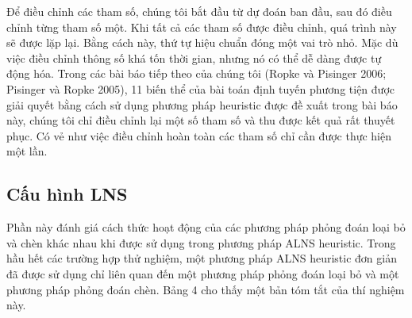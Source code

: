 Để điều chỉnh các tham số, chúng tôi bắt đầu từ dự đoán ban đầu, sau đó điều chỉnh từng tham số một. Khi tất cả các tham số được điều chỉnh, quá trình này sẽ được lặp lại. Bằng cách này, thứ tự hiệu chuẩn đóng một vai trò nhỏ. Mặc dù việc điều chỉnh thông số khá tốn thời gian, nhưng nó có thể dễ dàng được tự động hóa. Trong các bài báo tiếp theo của chúng tôi (Ropke và Pisinger 2006; Pisinger và Ropke 2005), 11 biến thể của bài toán định tuyến phương tiện được giải quyết bằng cách sử dụng phương pháp heuristic được đề xuất trong bài báo này, chúng tôi chỉ điều chỉnh lại một số tham số và thu được kết quả rất thuyết phục. Có vẻ như việc điều chỉnh hoàn toàn các tham số chỉ cần được thực hiện một lần.

\subsection{Cấu hình LNS}
Phần này đánh giá cách thức hoạt động của các phương pháp phỏng đoán loại bỏ và chèn khác nhau khi được sử dụng trong phương pháp ALNS heuristic. Trong hầu hết các trường hợp thử nghiệm, một phương pháp ALNS heuristic đơn giản đã được sử dụng chỉ liên quan đến một phương pháp phỏng đoán loại bỏ và một phương pháp phỏng đoán chèn. Bảng 4 cho thấy một bản tóm tắt của thí nghiệm này.

